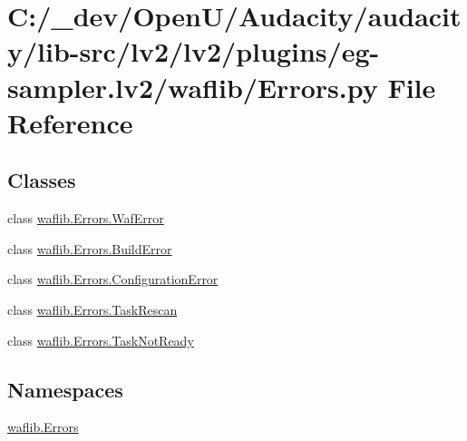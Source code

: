 \hypertarget{lv2_2plugins_2eg-sampler_8lv2_2waflib_2_errors_8py}{}\section{C\+:/\+\_\+dev/\+Open\+U/\+Audacity/audacity/lib-\/src/lv2/lv2/plugins/eg-\/sampler.lv2/waflib/\+Errors.py File Reference}
\label{lv2_2plugins_2eg-sampler_8lv2_2waflib_2_errors_8py}
\subsection*{Classes}
\begin{DoxyCompactItemize}
\item 
class \hyperlink{classwaflib_1_1_errors_1_1_waf_error}{waflib.\+Errors.\+Waf\+Error}
\item 
class \hyperlink{classwaflib_1_1_errors_1_1_build_error}{waflib.\+Errors.\+Build\+Error}
\item 
class \hyperlink{classwaflib_1_1_errors_1_1_configuration_error}{waflib.\+Errors.\+Configuration\+Error}
\item 
class \hyperlink{classwaflib_1_1_errors_1_1_task_rescan}{waflib.\+Errors.\+Task\+Rescan}
\item 
class \hyperlink{classwaflib_1_1_errors_1_1_task_not_ready}{waflib.\+Errors.\+Task\+Not\+Ready}
\end{DoxyCompactItemize}
\subsection*{Namespaces}
\begin{DoxyCompactItemize}
\item 
 \hyperlink{namespacewaflib_1_1_errors}{waflib.\+Errors}
\end{DoxyCompactItemize}
